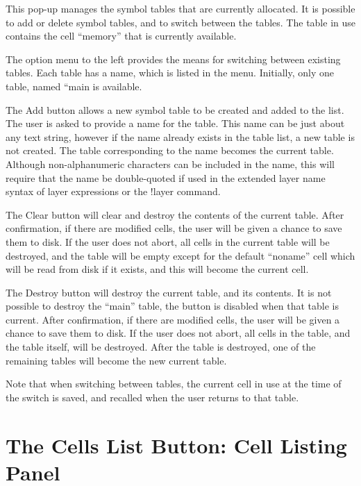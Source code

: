 This pop-up manages the symbol tables that are currently allocated. 
It is possible to add or delete symbol tables, and to switch between
the tables.  The table in use contains the cell ``memory'' that is
currently available.

The option menu to the left provides the means for switching between
existing tables.  Each table has a name, which is listed in the menu. 
Initially, only one table, named ``{\vt main} is available.

The {\cb Add} button allows a new symbol table to be created and added
to the list.  The user is asked to provide a name for the table.  This
name can be just about any text string, however if the name already
exists in the table list, a new table is not created.  The table
corresponding to the name becomes the current table.  Although
non-alphanumeric characters can be included in the name, this will
require that the name be double-quoted if used in the extended layer
name syntax of layer expressions or the {\cb !layer} command.

The {\cb Clear} button will clear and destroy the contents of the
current table.  After confirmation, if there are modified cells, the
user will be given a chance to save them to disk.  If the user does
not abort, all cells in the current table will be destroyed, and the
table will be empty except for the default ``{\vt noname}'' cell which
will be read from disk if it exists, and this will become the current
cell.

The {\cb Destroy} button will destroy the current table, and its
contents.  It is not possible to destroy the ``{\vt main}'' table,
the button is disabled when that table is current.  After
confirmation, if there are modified cells, the user will be given a
chance to save them to disk.  If the user does not abort, all cells in
the table, and the table itself, will be destroyed.  After the table
is destroyed, one of the remaining tables will become the new current
table.

Note that when switching between tables, the current cell in use at
the time of the switch is saved, and recalled when the user returns to
that table.


\section{The {\cb Cells List} Button: Cell Listing Panel}

